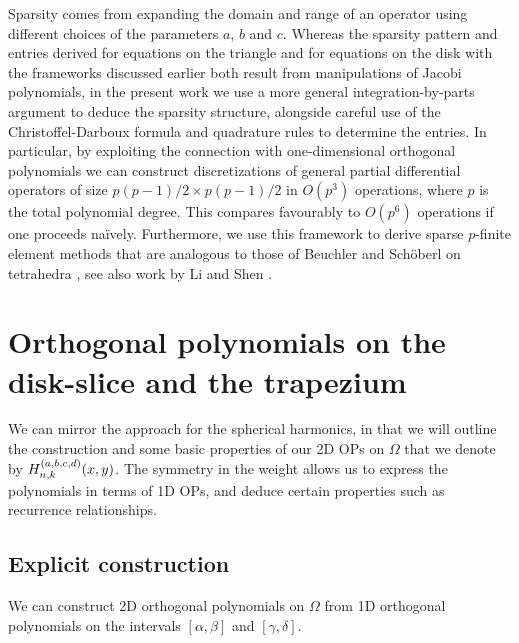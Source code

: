 Sparsity comes from expanding the domain and range of an operator using different choices of the parameters $a$, $b$ and $c$. Whereas the sparsity pattern and entries derived for equations on the triangle \cite{olver2018recurrence, olver2019triangle} and for equations on the disk \cite{vasil2016tensor} with the frameworks discussed earlier both result from manipulations of Jacobi polynomials, in the present work we use a more general integration-by-parts argument to deduce the sparsity structure, alongside careful use of the Christoffel-Darboux formula \cite[18.2.2]{DLMF} and quadrature rules to determine the entries. In particular, by exploiting the connection with one-dimensional orthogonal polynomials we can construct discretizations of general partial differential operators of size $p(p-1)/2 \times p(p-1)/2$ in $O(p^3)$ operations, where $p$ is the total polynomial degree. This compares favourably to $O(p^6)$ operations if one proceeds na\"ively. Furthermore, we use this framework to derive sparse $p$-finite element methods that are analogous to those of Beuchler and Sch\"oberl on tetrahedra \cite{beuchler2006new}, see also work by Li and Shen \cite{li2010optimal}.



\section{Orthogonal polynomials on the disk-slice and the trapezium}\label{Section:OPs}

We can mirror the approach for the spherical harmonics, in that we will outline the construction and some basic properties of our 2D OPs on $\Omega$ that we denote by $H_{n,k}^{(a,b,c,d)}(x,y)$. The symmetry in the weight allows us to express the polynomials in terms of 1D OPs, and deduce certain properties such as recurrence relationships. 

\subsection{Explicit construction}

We can construct 2D orthogonal polynomials on $\Omega$ from 1D orthogonal polynomials on the intervals $[\alpha,\beta]$ and $[\gamma,\delta]$. 

